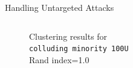 \begin{frame}{Handling Untargeted Attacks}
\begin{columns}
\begin{column}{.4\textwidth}
\begin{figure}
{            \caption*{Clustering results for\\ \texttt{colluding minority 100U}\\ 
            Rand index=1.0
            }
        }
      \end{figure}
    \end{column}

  \begin{column}{.6\textwidth}
    \begin{table}
        \centering
    

\end{table}
\end{column}
\end{columns}
\end{frame}
